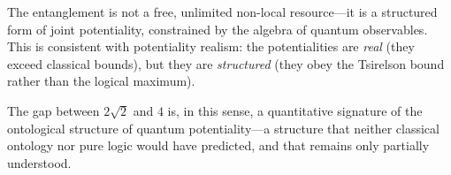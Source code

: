\medskip

The entanglement is not a free, unlimited non-local resource---it is a structured form of joint potentiality, constrained by the algebra of quantum observables. This is consistent with potentiality realism: the potentialities are \textit{real} (they exceed classical bounds), but they are \textit{structured} (they obey the Tsirelson bound rather than the logical maximum).

\medskip

The gap between $2\sqrt{2}$ and $4$ is, in this sense, a quantitative signature of the ontological structure of quantum potentiality---a structure that neither classical ontology nor pure logic would have predicted, and that remains only partially understood.
